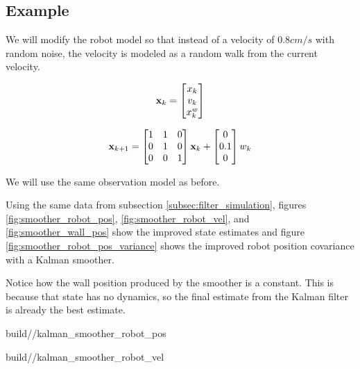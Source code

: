 \subsection{Example}

We will modify the robot model so that instead of a velocity of $0.8 cm/s$ with
random noise, the velocity is modeled as a random walk from the current
velocity.

\begin{equation}
  \mathbf{x}_k =
  \begin{bmatrix}
    x_k \\
    v_k \\
    x_k^w
  \end{bmatrix}
\end{equation}

\begin{equation}
  \mathbf{x}_{k+1} =
  \begin{bmatrix}
    1 & 1 & 0 \\
    0 & 1 & 0 \\
    0 & 0 & 1
  \end{bmatrix} \mathbf{x}_k +
  \begin{bmatrix}
    0 \\
    0.1 \\
    0
  \end{bmatrix} w_k
\end{equation}

We will use the same observation model as before.

Using the same data from subsection \ref{subsec:filter_simulation}, figures
\ref{fig:smoother_robot_pos}, \ref{fig:smoother_robot_vel}, and
\ref{fig:smoother_wall_pos} show the improved \gls{state} estimates and figure
\ref{fig:smoother_robot_pos_variance} shows the improved robot position
covariance with a Kalman smoother.

Notice how the wall position produced by the smoother is a constant. This is
because that \gls{state} has no dynamics, so the final estimate from the Kalman
filter is already the best estimate.

\begin{svg}{build/\chapterpath/kalman_smoother_robot_pos}
  \caption{Robot position with Kalman smoother}
  \label{fig:smoother_robot_pos}
\end{svg}

\begin{svg}{build/\chapterpath/kalman_smoother_robot_vel}
  \caption{Robot velocity with Kalman smoother}
  \label{fig:smoother_robot_vel}
\end{svg}

